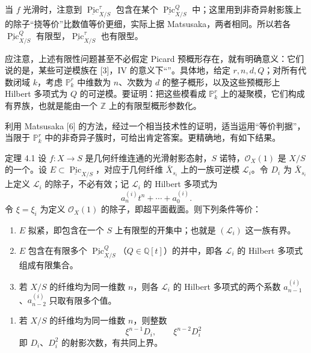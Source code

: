 当 $f$ 光滑时，注意到 $\underline{\operatorname{Pic}}^\tau_{X/S}$ 包含在某个 $\underline{\operatorname{Pic}}^Q_{X/S}$ 中；这里用到非奇异射影簇上的除子“挠等价”比数值等价更细，实际上据 Matsusaka，两者相同。所以若各 $\underline{\operatorname{Pic}}^Q_{X/S}$ 有限型，$\underline{\operatorname{Pic}}^\tau_{X/S}$ 也有限型。

应注意，上述有限性问题甚至不必假定 Picard 预概形存在，就有明确意义：它们说的是，某些可逆模族在 [3]，IV 的意义下“”。具体地，给定 $r,n,d,Q$；对所有代数闭域 $k$，考虑 $\mathbb P_k^r$ 中维数为 $n$、次数为 $d$ 的整子概形，以及这些预概形上 Hilbert 多项式为 $Q$ 的可逆模。要证明：把这些模看成 $\mathbb P_k^r$ 上的凝聚模，它们构成有界族，也就是能由一个 $\mathbb Z$ 上的有限型概形参数化。

利用 Matsusaka [6] 的方法，经过一个相当技术性的证明，适当运用“等价判据”，当限于 $\mathbb P_k^r$ 中的非奇异子簇时，可给出肯定答案。更精确地，有如下结果。

\begin{statement}{定理 4.1}
设 $f\colon X\to S$ 是几何纤维连通的光滑射影态射，$S$ 诺特，$\mathcal O_X(1)$ 是 $X/S$ 的一个。设 $E\subset\underline{\operatorname{Pic}}_{X/S}$，对应于几何纤维 $\bar X_{s_i}$ 上的一族可逆模 $\mathcal L_i$。令 $D_i$ 为 $\bar X_{s_i}$ 上定义 $\mathcal L_i$ 的除子，不必有效；记 $\mathcal L_i$ 的 Hilbert 多项式为
\[
 a_n^{(i)}t^n+\cdots+a_0^{(i)}.
\]
令 $\xi=\xi_i$ 为定义 $\mathcal O_X(1)$ 的除子，即超平面截面。则下列条件等价：
\begin{enumerate}
\item[a.] $E$ 拟紧，即包含在一个 $S$ 上有限型的开集中；也就是 $(\mathcal L_i)$ 这一族有界。
\item[b.] $E$ 包含在有限多个 $\underline{\operatorname{Pic}}^Q_{X/S}$（$Q\in\mathbb Q[t]$）的并中，即各 $\mathcal L_i$ 的 Hilbert 多项式组成有限集合。
\item[b$'$.] 若 $X/S$ 的纤维均为同一维数 $n$，则各 $\mathcal L_i$ 的 Hilbert 多项式的两个系数 $a_{n-1}^{(i)}$、$a_{n-2}^{(i)}$ 只取有限多个值。
\end{enumerate}
\begin{enumerate}
\item[b$''$.] 若 $X/S$ 的纤维均为同一维数 $n$，则整数
\[
 \xi^{n-1}D_i,\qquad \xi^{n-2}D_i^2
\]
即 $D_i$、$D_i^2$ 的射影次数，有共同上界。
\end{enumerate}
\end{statement}

